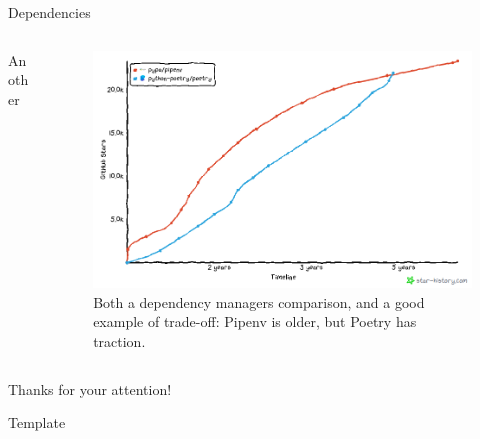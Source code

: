 \documentclass[9pt]{beamer}
\begin{document}
\begin{frame}{Dependencies}
    \begin{columns}
        \begin{column}{0.5\textwidth}
            Another
        \end{column}
        \begin{column}{0.5\textwidth}
            \begin{figure}
                \centering
                \begin{tcolorbox}[size=tight,sharpish corners,boxrule=0mm]
                    \includegraphics[width=\textwidth]{poetry-vs-pipenv}
                \end{tcolorbox}
                \caption{
                    Both a dependency managers comparison, and a good example
                    of trade-off: Pipenv is older, but Poetry has traction.
                }
            \end{figure}
        \end{column}
    \end{columns}
\end{frame}

\begin{frame}[standout]
    Thanks for your attention!
\end{frame}

\appendix

\begin{frame}{Template}
    \begin{columns}
        \begin{column}{0.5\textwidth}
            
        \end{column}
        \begin{column}{0.5\textwidth}
            
        \end{column}
    \end{columns}
\end{frame}
\end{document}
